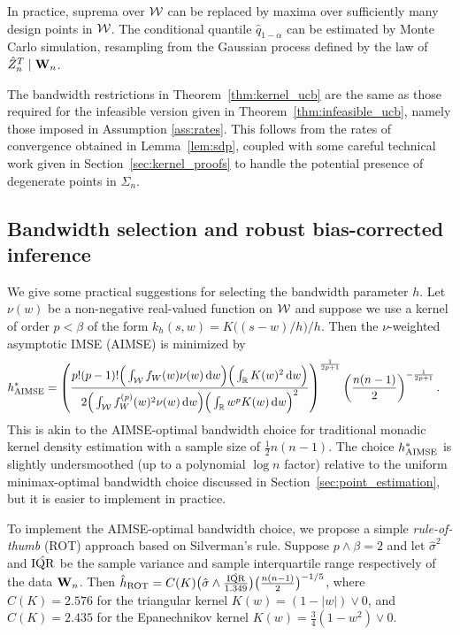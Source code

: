 In practice, suprema over $\mathcal{W}$ can be
replaced by maxima over sufficiently many design points in $\mathcal{W}$.
The conditional quantile $\hat q_{1-\alpha}$
can be estimated by Monte Carlo simulation,
resampling from the Gaussian process defined by the law of
$\hat Z_n^T \mid \mathbf{W}_n$.

The bandwidth restrictions in Theorem~\ref{thm:kernel_ucb} are the same
as those required for the infeasible version
given in Theorem~\ref{thm:infeasible_ucb}, namely those imposed in Assumption
\ref{ass:rates}. This follows from the rates of convergence obtained in
Lemma~\ref{lem:sdp}, coupled with some careful technical work given in
Section~\ref{sec:kernel_proofs} to handle the potential presence
of degenerate points in $\Sigma_n$.

\subsection{Bandwidth selection and robust bias-corrected inference}
\label{sec:bandwidth_selection}

We give some practical suggestions for selecting
the bandwidth parameter $h$.
Let $\nu(w)$ be a non-negative real-valued function on $\mathcal{W}$ and
suppose we use a kernel of order $p < \beta$
of the form $k_h(s,w) = K\big((s-w) / h\big)/h$.
Then the $\nu$-weighted asymptotic IMSE (AIMSE) is minimized by
%
\begin{align*}
  h^*_{\operatorname{AIMSE}}
  &=
  \left(
    \frac{
      p!(p-1)!
      \Big(\int_{\mathcal{W}} f_W(w) \nu(w) \,\mathrm{d}w\Big)
      \Big(\int_{\mathbb{R}} K(w)^2 \,\mathrm{d}w\Big)
    }
    {
      2
      \Big(
        \int_{\mathcal{W}}
        f_W^{(p)}(w)^2
        \nu(w)
        \,\mathrm{d}w
      \Big)
      \Big(
        \int_{\mathbb{R}}
        w^p K(w)
        \,\mathrm{d}w
      \Big)^2
    }
  \right)^{\frac{1}{2p+1}}
  \left(
    \frac{n(n-1)}{2}
  \right)^{-\frac{1}{2p+1}}.
\end{align*}
%
This is akin to the AIMSE-optimal bandwidth choice for traditional
monadic kernel density estimation
with a sample size of $\frac{1}{2}n(n-1)$.
The choice $h^*_{\operatorname{AIMSE}}$ is slightly undersmoothed
(up to a polynomial $\log n$ factor)
relative to the uniform minimax-optimal bandwidth choice discussed in
Section~\ref{sec:point_estimation}, but it is easier to implement in practice.

To implement the AIMSE-optimal bandwidth choice,
we propose a simple \emph{rule-of-thumb} (ROT)
approach based on Silverman's rule.
Suppose $p\wedge\beta=2$ and let $\hat\sigma^2$ and $\hat{\operatorname{IQR}}$
be the sample variance and sample interquartile range respectively
of the data $\mathbf{W}_n$. Then
$\hat{h}_{\operatorname{ROT}} = C(K) \big( \hat\sigma \wedge
\frac{\hat{\operatorname{IQR}}}{1.349} \big) \big(\frac{n(n-1)}{2} \big)^{-1/5}$,
where $C(K)=2.576$ for the triangular kernel $K(w) = (1 - |w|) \vee 0$,
and $C(K)=2.435$ for the Epanechnikov kernel
$K(w) = \frac{3}{4}(1 - w^2) \vee 0$.


